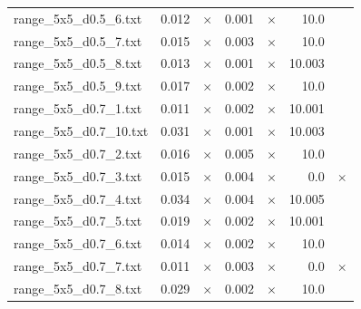 \documentclass{article}
\begin{document}
\begin{center}
\begin{tabular}{lrrrrrr}
range\_5x5\_d0.5\_6.txt & 0.012 & 
$\times$
 & 0.001 & 
$\times$
 & 10.0 & 
\\
range\_5x5\_d0.5\_7.txt & 0.015 & 
$\times$
 & 0.003 & 
$\times$
 & 10.0 & 
\\
range\_5x5\_d0.5\_8.txt & 0.013 & 
$\times$
 & 0.001 & 
$\times$
 & 10.003 & 
\\
range\_5x5\_d0.5\_9.txt & 0.017 & 
$\times$
 & 0.002 & 
$\times$
 & 10.0 & 
\\
range\_5x5\_d0.7\_1.txt & 0.011 & 
$\times$
 & 0.002 & 
$\times$
 & 10.001 & 
\\
range\_5x5\_d0.7\_10.txt & 0.031 & 
$\times$
 & 0.001 & 
$\times$
 & 10.003 & 
\\
range\_5x5\_d0.7\_2.txt & 0.016 & 
$\times$
 & 0.005 & 
$\times$
 & 10.0 & 
\\
range\_5x5\_d0.7\_3.txt & 0.015 & 
$\times$
 & 0.004 & 
$\times$
 & 0.0 & 
$\times$
\\
range\_5x5\_d0.7\_4.txt & 0.034 & 
$\times$
 & 0.004 & 
$\times$
 & 10.005 & 
\\
range\_5x5\_d0.7\_5.txt & 0.019 & 
$\times$
 & 0.002 & 
$\times$
 & 10.001 & 
\\
range\_5x5\_d0.7\_6.txt & 0.014 & 
$\times$
 & 0.002 & 
$\times$
 & 10.0 & 
\\
range\_5x5\_d0.7\_7.txt & 0.011 & 
$\times$
 & 0.003 & 
$\times$
 & 0.0 & 
$\times$
\\
range\_5x5\_d0.7\_8.txt & 0.029 & 
$\times$
 & 0.002 & 
$\times$
 & 10.0 & 
\\
\hline\end{tabular}
\end{center}
\end{document}
